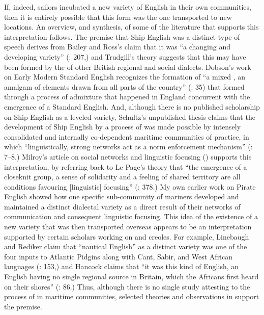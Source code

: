 If, indeed, sailors incubated a new variety of English in their own communities, then it is entirely possible that this form was the one transported to new locations. An overview, and synthesis, of some of the literature that supports this interpretation follows. The premise that Ship English was a distinct type of speech derives from Bailey and Ross’s claim that it was “a changing and developing variety” (\citeyear*{BaileyRoss1988}: 207,) and Trudgill’s theory suggests that this may have been formed by the  of other British regional and social dialects. Dobson’s work on Early Modern Standard English recognizes the formation of “a mixed , an amalgam of elements drawn from all parts of the country” (\citeyear{Dobson1955}: 35) that formed through a process of admixture that happened in England concurrent with the emergence of a Standard English. And, although there is no published scholarship on Ship English as a leveled variety, Schultz’s unpublished thesis claims that the development of Ship English by a process of   was made possible by intensely consolidated and internally co-dependent maritime communities of practice, in which “linguistically, strong networks act as a norm enforcement mechanism” (\citeyear{Schultz2010}: 7--8.) Milroy’s article on social networks and linguistic focusing (\citeyear*{Milroy1986}) supports this interpretation, by referring back to Le Page’s theory that “the emergence of a closeknit group, a sense of solidarity and a feeling of shared territory are all conditions favouring [linguistic] focusing” (\citeyear*{Milroy1986}: 378.) My own earlier work on Pirate English \citep{Delgado2013} showed how one specific sub-community of mariners developed and maintained a distinct dialectal variety as a direct result of their networks of communication and consequent linguistic focusing. This idea of the existence of a new variety that was then transported overseas appears to be an interpretation supported by certain scholars working on  and creoles.  For example, Linebaugh and Rediker claim that “nautical English” as a distinct variety was one of the four inputs to Atlantic Pidgins along with Cant, Sabir, and West African languages (\citeyear{LinebaughRediker2000}: 153,) and Hancock claims that “it was this kind of English, an English having no single regional source in Britain, which the Africans first heard on their shores” (\citeyear*{Hancock1986}: 86.) Thus, although there is no single study attesting to the process of  in maritime communities, selected theories and observations in  support the premise. 

